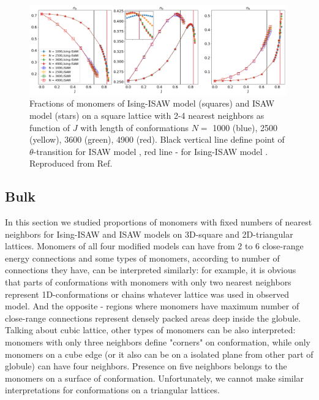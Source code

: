 \documentclass[a4paper]{jpconf}
\begin{document}
\begin{figure}
    \centering
    \includegraphics[width=0.99\textwidth]{Images/bulk2-4_inset.png}
    \caption{Fractions of monomers of Ising-ISAW model (squares) and ISAW model (stars) on a square lattice with 2-4 nearest neighbors as function of $J$ with length of conformations $N = $ 1000 (blue), 2500 (yellow), 3600 (green), 4900 (red). Black vertical line define point of $\theta$-transition for ISAW model \cite{Caracciolo2011}, red line - for Ising-ISAW model \cite{faizullina2021critical, Foster2021}. Reproduced from Ref.\cite{faizullina2021critical}}
    \label{fig:Ising_vs_ISAW2D}
\end{figure}

\subsection{Bulk}

In this section we studied proportions of monomers with fixed numbers of nearest neighbors for Ising-ISAW and ISAW models on 3D-square and 2D-triangular lattices. Monomers of all four modified models can have from 2 to 6 close-range energy connections and some types of monomers, according to number of connections they have, can be interpreted similarly: for example, it is obvious that parts of conformations with monomers with only two nearest neighbors represent 1D-conformations or chains whatever lattice was used in observed model. And the opposite - regions where monomers have maximum number of close-range connections represent densely packed areas deep inside the globule. Talking about cubic lattice, other types of monomers can be also interpreted: monomers with only three neighbors define "corners" on conformation, while only monomers on a cube edge (or it also can be on a isolated plane from other part of globule) can have four neighbors. Presence on five neighbors belongs to the monomers on a surface of conformation. Unfortunately, we cannot make similar interpretations for conformations on a triangular lattices.
\end{document}
